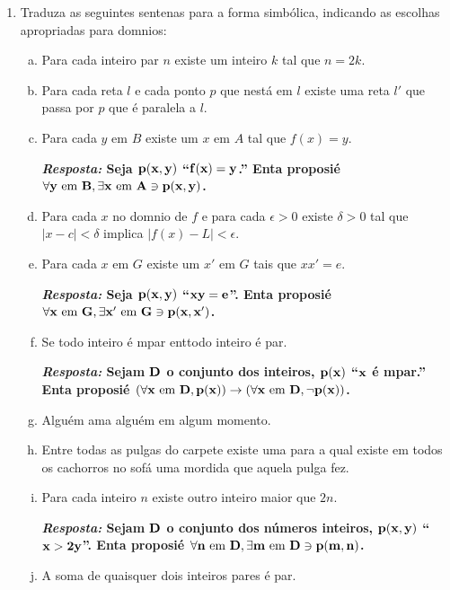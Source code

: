 \begin{enumerate}[{\bf 1.}]
\item Traduza as seguintes senten\cc as para a forma simb\'olica, indicando as escolhas apropriadas para dom\ih nios:
\begin{enumerate}[a)]
\item Para cada inteiro par $n$ existe um inteiro $k$ tal que $n=2k$.
\item Para cada reta $l$ e cada ponto $p$ que n\ao est\'a em $l$ existe uma reta $l'$ que passa por $p$ que \'e paralela a $l$.
\item Para cada $y$ em $B$ existe um $x$ em $A$ tal que $f(x)=y$.

{\bf{\it Resposta:} Seja ${\bf p(x,y)}$ ``${\bf f(x)=y}$.'' Ent\ao a proposi\cao \'e ${\bf \forall y \textrm{ em } B, \exists x \textrm{ em } A \ni p(x,y)}$.}

\item Para cada $x$ no dom\ih nio de $f$ e para cada $\epsilon >0$ existe $\delta >0$ tal que $|x-c|<\delta$ implica $|f(x)-L|<\epsilon$.
\item Para cada $x$ em $G$ existe um $x'$ em $G$ tais que $xx'=e$.

{\bf{\it Resposta:}  Seja ${\bf p(x,y)}$ ``${\bf xy=e}$''. Ent\ao a proposi\cao \'e ${\bf \forall x \textrm{ em } G, \exists x' \textrm{ em } G  \ni p(x,x')}$.}

\item Se todo inteiro \'e \ih mpar ent\ao todo inteiro \'e par. 

{\bf{\it Resposta:} Sejam ${\bf D}$ o conjunto dos inteiros, ${\bf p(x)}$ ``${\bf x}$ \'e \ih mpar.'' Ent\ao a proposi\cao \'e ${\bf(\forall x \textrm{ em } D, p(x))\to(\forall x \textrm{ em } D, \lnot p(x))}$.}

\item Algu\'em ama algu\'em em algum momento.
\item Entre todas as pulgas do carpete existe uma para a qual existe em todos os cachorros no sof\'a uma mordida que aquela pulga fez.
\item Para cada inteiro $n$ existe outro inteiro maior que $2n$.

{\bf{\it Resposta:}  Sejam ${\bf D}$ o conjunto dos n\'umeros inteiros, ${\bf p(x,y)}$ ``${\bf x>2y}$''. Ent\ao a proposi\cao \'e ${\bf \forall n \textrm{ em } D, \exists m \textrm{ em } D  \ni p(m,n)}$.}

\item A soma de quaisquer dois inteiros pares \'e par.


\end{enumerate}
\end{enumerate}
